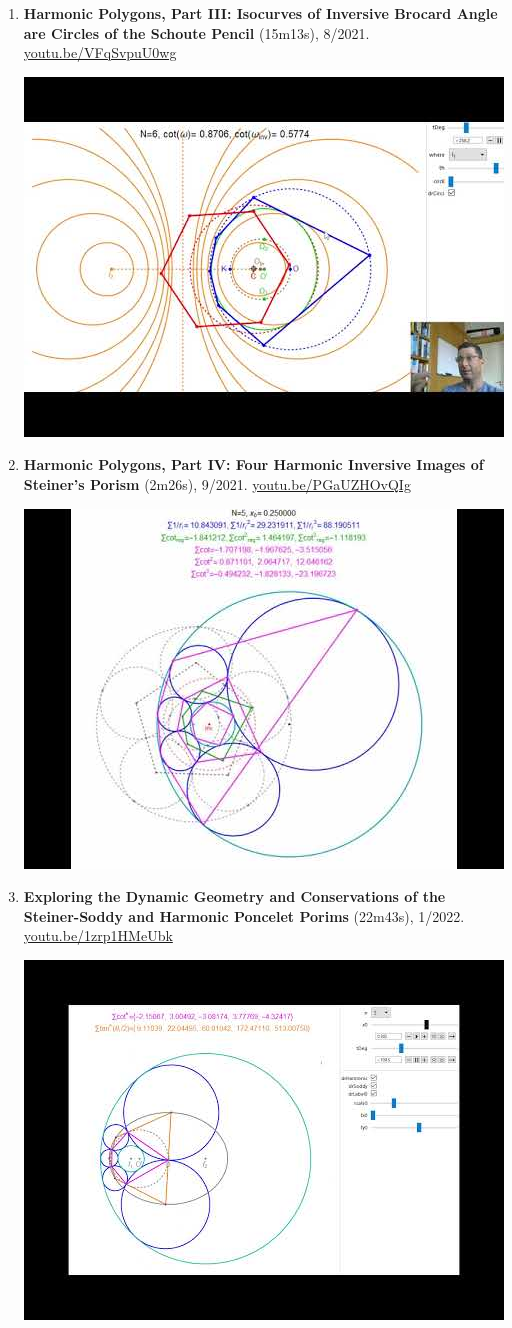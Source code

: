 \documentclass[12pt]{article}
\begin{document}
\begin{enumerate}[resume]
% 
\item \textbf{Harmonic Polygons, Part III: Isocurves of Inversive Brocard Angle are Circles of the Schoute Pencil} (15m13s), 8/2021. \href{https://youtu.be/VFqSvpuU0wg}{\url{youtu.be/VFqSvpuU0wg}}
\begin{center}\includegraphics[width=.5\textwidth]{pics/VFqSvpuU0wg.jpg}\end{center}
% 
\item \textbf{Harmonic Polygons, Part IV: Four Harmonic Inversive Images of Steiner's Porism} (2m26s), 9/2021. \href{https://youtu.be/PGaUZHOvQIg}{\url{youtu.be/PGaUZHOvQIg}}
\begin{center}\includegraphics[width=.5\textwidth]{pics/PGaUZHOvQIg.jpg}\end{center}
% 
\item \textbf{Exploring the Dynamic Geometry and Conservations of the Steiner-Soddy and Harmonic Poncelet Porims} (22m43s), 1/2022. \href{https://youtu.be/1zrp1HMeUbk}{\url{youtu.be/1zrp1HMeUbk}}
\begin{center}\includegraphics[width=.5\textwidth]{pics/1zrp1HMeUbk.jpg}\end{center}
% 
\end{enumerate}
\end{document}
